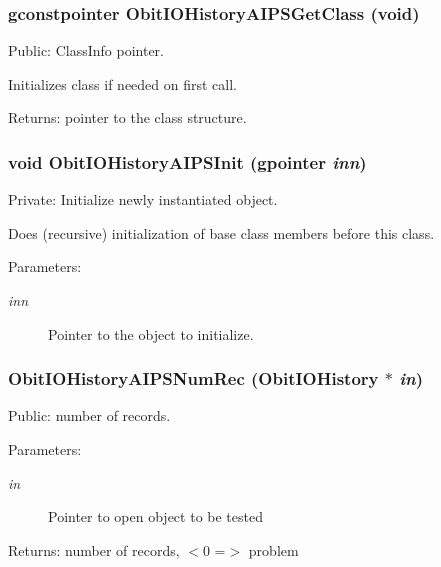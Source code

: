 \subsubsection{\setlength{\rightskip}{0pt plus 5cm}gconstpointer Obit\-IOHistory\-AIPSGet\-Class (void)}\label{ObitIOHistoryAIPS_8c_a11}


Public: Class\-Info pointer. 

Initializes class if needed on first call. \begin{Desc}
\item[Returns:]pointer to the class structure. \end{Desc}
\subsubsection{\setlength{\rightskip}{0pt plus 5cm}void Obit\-IOHistory\-AIPSInit (gpointer {\em inn})}\label{ObitIOHistoryAIPS_8c_a4}


Private: Initialize newly instantiated object. 

Does (recursive) initialization of base class members before this class. \begin{Desc}
\item[Parameters:]
\begin{description}
\item[{\em inn}]Pointer to the object to initialize. \end{description}
\end{Desc}
\subsubsection{ Obit\-IOHistory\-AIPSNum\-Rec ({\bf Obit\-IOHistory} $\ast$ {\em in})}\label{ObitIOHistoryAIPS_8c_a20}


Public: number of records. 

\begin{Desc}
\item[Parameters:]
\begin{description}
\item[{\em in}]Pointer to open object to be tested \end{description}
\end{Desc}
\begin{Desc}
\item[Returns:]number of records, $<$0 =$>$ problem \end{Desc}
